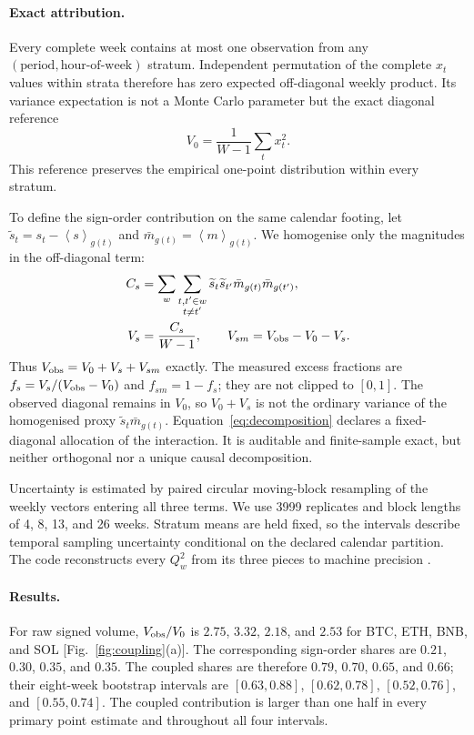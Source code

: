 \documentclass[aps,prl,twocolumn,superscriptaddress,floatfix,nofootinbib]{revtex4-2}
\newcommand{\avg}[1]{\left\langle #1 \right\rangle}
\begin{document}
\paragraph*{Exact attribution.}
Every complete week contains at most one observation from any
$(\text{period},\text{hour-of-week})$ stratum.  Independent permutation of the
complete $x_t$ values within strata therefore has zero expected off-diagonal
weekly product.  Its variance expectation is not a Monte Carlo parameter but
the exact diagonal reference
\begin{equation}
 V_0=\frac{1}{W-1}\sum_t x_t^2 .
 \label{eq:marginal-reference}
\end{equation}
This reference preserves the empirical one-point distribution within every
stratum.

To define the sign-order contribution on the same calendar footing, let
$\widetilde s_t=s_t-\avg{s}_{g(t)}$ and
$\bar m_{g(t)}=\avg{m}_{g(t)}$.  We homogenise only the magnitudes in the
off-diagonal term:
\begin{align}
 C_s&=\sum_w\sum_{\substack{t,t'\in w\\t\ne t'}}
 \widetilde s_t\widetilde s_{t'}
 \bar m_{g(t)}\bar m_{g(t')},\nonumber\\
 V_s&=\frac{C_s}{W-1},\qquad
 V_{sm}=V_{\rm obs}-V_0-V_s .
 \label{eq:decomposition}
\end{align}
Thus $V_{\rm obs}=V_0+V_s+V_{sm}$ exactly.  The measured excess fractions are
$f_s=V_s/(V_{\rm obs}-V_0)$ and $f_{sm}=1-f_s$; they are not clipped to
$[0,1]$.  The observed diagonal remains in $V_0$, so $V_0+V_s$ is not the
ordinary variance of the homogenised proxy $\widetilde s_t\bar m_{g(t)}$.
Equation~\eqref{eq:decomposition} declares a fixed-diagonal allocation of the
interaction.  It is auditable and finite-sample exact, but neither orthogonal
nor a unique causal decomposition.

Uncertainty is estimated by paired circular moving-block resampling of the
weekly vectors entering all three terms.  We use 3999 replicates and block
lengths of 4, 8, 13, and 26 weeks.  Stratum means are held fixed, so the
intervals describe temporal sampling uncertainty conditional on the declared
calendar partition.  The code reconstructs every $Q_w^2$ from its three pieces
to machine precision \cite{code_keldysh_finance,supplement}.

\paragraph*{Results.}
For raw signed volume, $V_{\rm obs}/V_0$ is $2.75$, $3.32$, $2.18$, and $2.53$
for BTC, ETH, BNB, and SOL [Fig.~\ref{fig:coupling}(a)].  The corresponding
sign-order shares are $0.21$, $0.30$, $0.35$, and $0.35$.  The coupled shares
are therefore $0.79$, $0.70$, $0.65$, and $0.66$; their eight-week bootstrap
intervals are $[0.63,0.88]$, $[0.62,0.78]$, $[0.52,0.76]$, and
$[0.55,0.74]$.  The coupled contribution is larger than one half in every
primary point estimate and throughout all four intervals.
\end{document}
